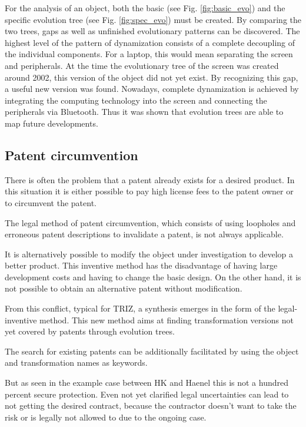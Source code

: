 \documentclass[11pt,a4paper]{article}
\begin{document}
For the analysis of an object, both the basic (see Fig. \ref{fig:basic_evo})
and the specific evolution tree (see Fig. \ref{fig:spec_evo}) must be created.
By comparing the two trees, gaps as well as unfinished evolutionary patterns
can be discovered. The highest level of the pattern of dynamization consists
of a complete decoupling of the individual components. For a laptop, this
would mean separating the screen and peripherals. At the time the evolutionary
tree of the screen was created around 2002, this version of the object did not
yet exist. By recognizing this gap, a useful new version was found. Nowadays,
complete dynamization is achieved by integrating the computing technology into
the screen and connecting the peripherals via Bluetooth. Thus it was shown
that evolution trees are able to map future developments.

\subsection{Patent circumvention}

There is often the problem that a patent already exists for a desired
product. In this situation it is either possible to pay high license fees to
the patent owner or to circumvent the patent.

The legal method of patent circumvention, which consists of using loopholes
and erroneous patent descriptions to invalidate a patent, is not always
applicable.

It is alternatively possible to modify the object under investigation to
develop a better product. This inventive method has the disadvantage of having
large development costs and having to change the basic design. On the other
hand, it is not possible to obtain an alternative patent without modification.

From this conflict, typical for TRIZ, a synthesis emerges in the form of the
legal-inventive method. This new method aims at finding transformation
versions not yet covered by patents through evolution trees.

The search for existing patents can be additionally facilitated by using the
object and transformation names as keywords.  

But as seen in the example case between HK and Haenel this is not a hundred
percent secure protection. Even not yet clarified legal uncertainties can lead
to not getting the desired contract, because the contractor doesn't want to
take the risk or is legally not allowed to due to the ongoing case. 
\end{document}
